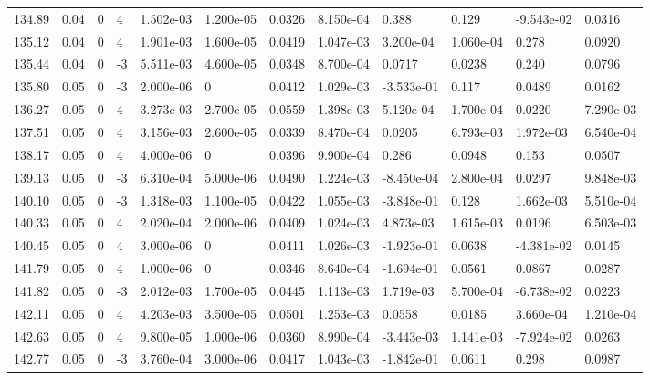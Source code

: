 \documentclass[preview]{standalone}
\begin{document}
{{{{{{{{\begin{tabular}{L{1.2cm}C{1.2cm} C{0.3cm}C{0.5cm} C{1.4cm}C{1.4cm} C{1.4cm}C{1.4cm} C{1.6cm}C{1.6cm} C{1.6cm}C{1.6cm}}
  134.89  &  0.04  & 0     &  4 &  1.502e-03  & 1.200e-05  &  0.0326&   8.150e-04& 0.388 & 0.129   &  -9.543e-02 & 0.0316  \\ 
  135.12  &  0.04  & 0     &  4 &  1.901e-03  & 1.600e-05  &  0.0419&   1.047e-03& 3.200e-04 & 1.060e-04   &  0.278 & 0.0920  \\ 
  135.44  &  0.04  & 0     & -3 &  5.511e-03  & 4.600e-05  &  0.0348&   8.700e-04& 0.0717 & 0.0238   &  0.240 & 0.0796  \\ 
  135.80  &  0.05  & 0     & -3 &  2.000e-06  & 0  &  0.0412&   1.029e-03& -3.533e-01 & 0.117   &  0.0489 & 0.0162  \\ 
  136.27  &  0.05  & 0     &  4 &  3.273e-03  & 2.700e-05  &  0.0559&   1.398e-03& 5.120e-04 & 1.700e-04   &  0.0220 & 7.290e-03  \\ 
  137.51  &  0.05  & 0     &  4 &  3.156e-03  & 2.600e-05  &  0.0339&   8.470e-04& 0.0205 & 6.793e-03   &  1.972e-03 & 6.540e-04  \\ 
  138.17  &  0.05  & 0     &  4 &  4.000e-06  & 0  &  0.0396&   9.900e-04& 0.286 & 0.0948   &  0.153 & 0.0507  \\ 
  139.13  &  0.05  & 0     & -3 &  6.310e-04  & 5.000e-06  &  0.0490&   1.224e-03& -8.450e-04 & 2.800e-04   &  0.0297 & 9.848e-03  \\ 
  140.10  &  0.05  & 0     & -3 &  1.318e-03  & 1.100e-05  &  0.0422&   1.055e-03& -3.848e-01 & 0.128   &  1.662e-03 & 5.510e-04  \\ 
  140.33  &  0.05  & 0     &  4 &  2.020e-04  & 2.000e-06  &  0.0409&   1.024e-03& 4.873e-03 & 1.615e-03   &  0.0196 & 6.503e-03  \\ 
  140.45  &  0.05  & 0     &  4 &  3.000e-06  & 0  &  0.0411&   1.026e-03& -1.923e-01 & 0.0638   &  -4.381e-02 & 0.0145  \\ 
  141.79  &  0.05  & 0     &  4 &  1.000e-06  & 0  &  0.0346&   8.640e-04& -1.694e-01 & 0.0561   &  0.0867 & 0.0287  \\ 
  141.82  &  0.05  & 0     & -3 &  2.012e-03  & 1.700e-05  &  0.0445&   1.113e-03& 1.719e-03 & 5.700e-04   &  -6.738e-02 & 0.0223  \\ 
  142.11  &  0.05  & 0     &  4 &  4.203e-03  & 3.500e-05  &  0.0501&   1.253e-03& 0.0558 & 0.0185   &  3.660e-04 & 1.210e-04  \\ 
  142.63  &  0.05  & 0     &  4 &  9.800e-05  & 1.000e-06  &  0.0360&   8.990e-04& -3.443e-03 & 1.141e-03   &  -7.924e-02 & 0.0263  \\ 
  142.77  &  0.05  & 0     & -3 &  3.760e-04  & 3.000e-06  &  0.0417&   1.043e-03& -1.842e-01 & 0.0611   &  0.298 & 0.0987  \\ 

\end{tabular}}}}}}}}}
\end{document}
